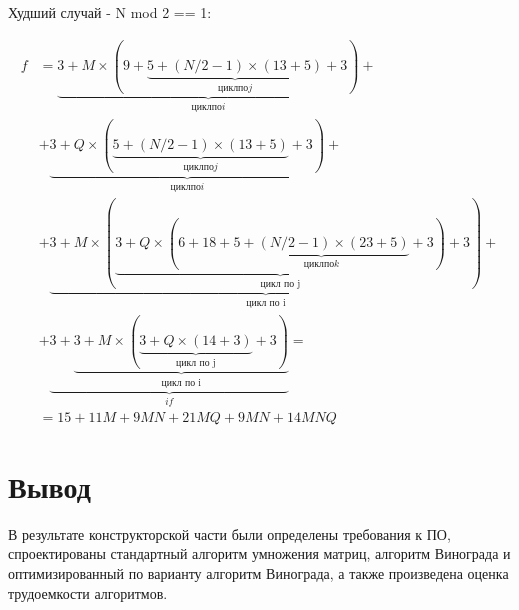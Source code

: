 Худший случай - N mod 2 == 1:

\begin{equation}
    \begin{aligned}
    f &=
    \underbrace{3 + M \times (9 + \underbrace{
    5 + (N/2-1) \times (13 + 5)
    }_{цикл по j} + 3)}_{цикл по i} + \\
    &+ \underbrace{3 + Q \times (\underbrace{
    5 + (N/2-1) \times (13 + 5)
    }_{цикл по j} + 3)}_{цикл по i} + \\
    &+ \underbrace{3 + M \times (\underbrace{3 + Q \times (6 + 18 + \underbrace{
    5 + (N/2-1) \times (23 + 5)
    }_{цикл по k} + 3)}_{\text{цикл по j}} + 3)}_{\text{цикл по i}} + \\
    &+ \underbrace{3 + 
    \underbrace{3 + M \times (\underbrace{3 + Q \times (14 + 3)}_{\text{цикл по j}} + 3)}_{\text{цикл по i}}
    }_{if} = \\
    &= 15+11M+9MN+21MQ+9MN+14MNQ
    \end{aligned}
\end{equation}

\section{Вывод}

В результате конструкторской части были определены требования к ПО, спроектированы стандартный алгоритм умножения матриц, алгоритм Винограда и оптимизированный по варианту алгоритм Винограда, а также произведена оценка трудоемкости алгоритмов.
